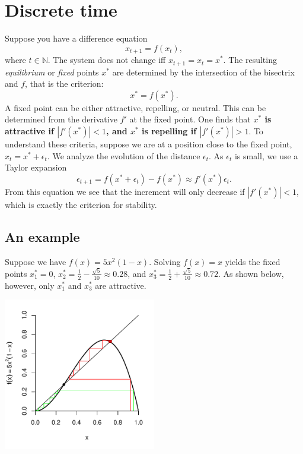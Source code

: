 \documentclass[Tutorial]{../cbg}\usepackage[]{graphicx}\usepackage[]{color}
\begin{document}
\maketitle




\section{Discrete time}
  Suppose you have a difference equation
	\begin{equation}
		\label{eq:discrete}
		x_{t+1} = f(x_t),
	\end{equation}
	where $t\in \mathbb{N}$. The system does not change iff $x_{t+1} = x_t = x^*$. The resulting \emph{equilibrium} or \emph{fixed} points $x^*$ are determined by the intersection of the bisectrix and $f$, that is the criterion:
	\begin{equation}
		\label{eq:5}
		x^*=f(x^*).
	\end{equation}
	A fixed point can be either attractive, repelling, or neutral. This can be determined from the derivative $f'$ at the fixed point. One finds that {\bf $x^*$ is attractive if $|f'(x^*)| < 1$, and $x^*$ is repelling if $|f'(x^*)|>1$}. To understand these criteria, suppose we are at a position close to the fixed point, $x_t = x^* + \epsilon_t$. We analyze the evolution of the distance $\epsilon_t$. As $\epsilon_t$ is small, we use a Taylor expansion
	\begin{equation}
		\label{eq:4}
		\epsilon_{t+1} = f(x^*+\epsilon_t) - f(x^*) \approx f'(x^*) \epsilon_t.
	\end{equation}
	From this equation we see that the increment will only decrease if $|f'(x^*)|<1$, which is exactly the criterion for stability.
	
	\subsection{An example}
	Suppose we have $f(x) = 5x^2(1-x)$. Solving $f(x) = x$ yields the fixed points $x_1^*=0$, $x_2^* = \frac{1}{2} - \frac{\sqrt{5}}{10} \approx 0.28$, and $x^*_3 = \frac{1}{2} + \frac{\sqrt{5}}{10} \approx 0.72$. As shown below, however, only $x^*_1$ and $x^*_3$ are attractive.
	\begin{center}
		\includegraphics[width=6.66cm]{tutorial-p2.pdf}
	\end{center}
\end{document}
